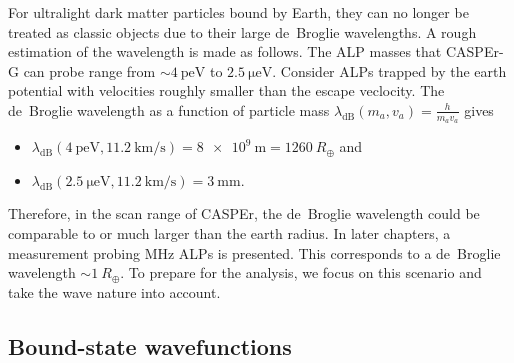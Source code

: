 For ultralight dark matter particles bound by Earth, they can no longer be treated as classic objects due to their large de~Broglie wavelengths. 
A rough estimation of the wavelength is made as follows. 
The ALP masses that CASPEr-G can probe range from $\sim\SI{4}{\pico\eV}$ to $\SI{2.5}{\micro\eV}$. 
Consider ALPs trapped by the earth potential with velocities roughly smaller than the escape veclocity.
The de~Broglie wavelength as a function of particle mass $\lambda_\mathrm{dB}(m_a, v_a) = \frac{h}{m_a v_a}$ gives 
\begin{itemize}
    \item $\lambda_\mathrm{dB}(\SI{4}{\pico\eV}, \SI{11.2}{\km/\second}) = \SI{8e9}{\m} = \SI{1260}{R_\oplus}$ and
    \item $\lambda_\mathrm{dB}(\SI{2.5}{\micro\eV}, \SI{11.2}{\km/\second}) = \SI{3}{\mm}$.
\end{itemize}
Therefore, in the scan range of CASPEr, the de~Broglie wavelength could be comparable to or much larger than the earth radius. 
In later chapters, a measurement probing MHz ALPs is presented. This corresponds to a de~Broglie wavelength $\sim\SI{1}{R_\oplus}$. 
To prepare for the analysis, we focus on this scenario and take the wave nature into account. 

\subsection{Bound-state wavefunctions}\label{sec:theory:earthALP:wavefunctions}

